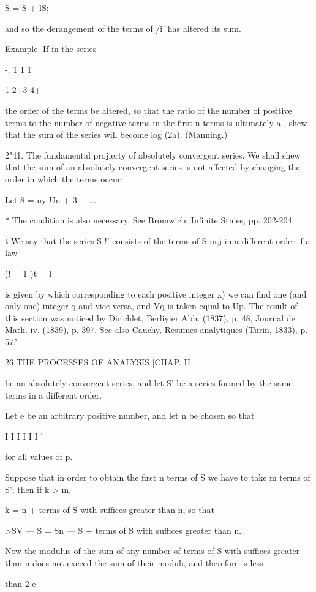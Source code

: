 S = S + lS;

and so the derangement of the terms of /i' has altered its sum.

Example. If in the series

-. 1 1 1

1-2+3-4+---

the order of the terms be altered, so that the ratio of the number of
positive terms to the number of negative terms in the first n terms is
ultimately a-, shew that the sum of the series will become log (2a).
(Manning.)

2"41. The fundamental projierty of absolutely convergent series. We
shall shew that the sum of an absolutely convergent series is not
affected by changing the order in which the terms occur.

Let 8 = uy Un + 3 + ...

* The coudition is also necessary. See Bromwicb, Infinite Stnies, pp.
202-204.

t We say that the series S !' consists of the terms of S m,j in a
different order if a law

)! = 1 )t = l

is given by which corresponding to each positive integer x) we can
find one (and only one) integer q and vice versa, and Vq is taken
equal to Up. The result of this section was noticed by Dirichlet,
Berliyier Abh. (1837), p. 48, Journal de Math. iv. (1839), p. 397. See
also Cauchy, Resumes analytiques (Turin, 1833), p. 57.'



26 THE PROCESSES OF ANALYSIS [CHAP. II

be an absolutely convergent series, and let S' be a series formed by
the same terms in a different order.

Let e be an arbitrary positive number, and let n be chosen so that

I I I I I I '

for all values of p.

Suppose that in order to obtain the first n terms of S we have to take
m terms of S'; then if k > m,

 k = n + terms of S with suffices greater than n, so that

>SV — S = Sn — S + terms of S with suffices greater than n.

Now the modulus of the sum of any number of terms of S with suffices
greater than n does not exceed the sum of their moduli, and therefore
is less

than 2 e-

